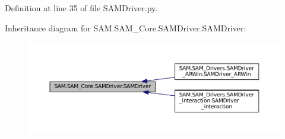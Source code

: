 Definition at line 35 of file S\+A\+M\+Driver.\+py.



Inheritance diagram for S\+A\+M.\+S\+A\+M\+\_\+\+Core.\+S\+A\+M\+Driver.\+S\+A\+M\+Driver\+:
\nopagebreak
\begin{figure}[H]
\begin{center}
\leavevmode
\includegraphics[width=350pt]{classSAM_1_1SAM__Core_1_1SAMDriver_1_1SAMDriver__inherit__graph}
\end{center}
\end{figure}
